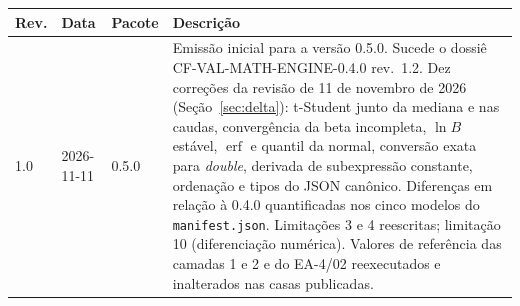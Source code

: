 \documentclass[11pt,a4paper]{article}
\newcommand{\docVersion}{0.5.0}
\newcommand{\docRevision}{1.0}
\newcommand{\reviewDate}{11 de novembro de 2026}
\begin{document}
\begin{tabularx}{\textwidth}{l l l X}
  \toprule
  \textbf{Rev.} & \textbf{Data} & \textbf{Pacote} & \textbf{Descrição} \\
  \midrule
  \docRevision & 2026-11-11 & \docVersion & Emissão inicial para a versão \docVersion{}. Sucede o dossiê CF-VAL-MATH-ENGINE-0.4.0 rev.\ 1.2. Dez correções da revisão de \reviewDate{} (Seção~\ref{sec:delta}): t-Student junto da mediana e nas caudas, convergência da beta incompleta, \(\ln B\) estável, \(\operatorname{erf}\) e quantil da normal, conversão exata para \emph{double}, derivada de subexpressão constante, ordenação e tipos do JSON canônico. Diferenças em relação à 0.4.0 quantificadas nos cinco modelos do \texttt{manifest.json}. Limitações 3 e 4 reescritas; limitação 10 (diferenciação numérica). Valores de referência das camadas 1 e 2 e do EA-4/02 reexecutados e inalterados nas casas publicadas. \\
  \bottomrule
\end{tabularx}
\end{document}
